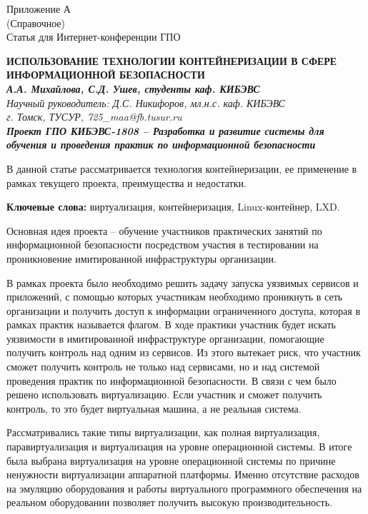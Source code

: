 
\begin{center}
Приложение А\\
(Справочное)\\
Статья для Интернет-конференции ГПО
\end{center}
\vspace{\baselineskip}

\begin{center}
\textbf{ИСПОЛЬЗОВАНИЕ ТЕХНОЛОГИИ КОНТЕЙНЕРИЗАЦИИ В СФЕРЕ ИНФОРМАЦИОННОЙ БЕЗОПАСНОСТИ}\\
\textbf{\textit{А.А. Михайлова, С.Д. Ушев, студенты каф. КИБЭВС}}\\
\textit{Научный руководитель: Д.С. Никифоров, мл.н.с. каф. КИБЭВС}\\
\textit{г. Томск, ТУСУР, 725\_maa@fb.tusur.ru}\\
\textbf{\textit{Проект ГПО КИБЭВС-1808 – Разработка и развитие системы для обучения и проведения практик по информационной безопасности}}
\end{center}
В данной статье рассматривается технология контейнеризации, ее применение в рамках текущего проекта, преимущества и недостатки.\par
\textbf{Ключевые слова: }виртуализация, контейнеризация, Linux-контейнер, LXD.\par
Основная идея проекта -- обучение участников практических занятий по информационной безопасности посредством участия в тестировании на проникновение имитированной инфраструктуры организации.\par
В рамках проекта было необходимо решить задачу запуска уязвимых сервисов и приложений,  с помощью которых участникам необходимо проникнуть в сеть организации и получить доступ к информации ограниченного доступа, которая в рамках практик называется флагом. В ходе практики участник будет искать уязвимости в имитированной инфраструктуре организации, помогающие получить контроль над одним из сервисов. Из этого вытекает риск, что участник сможет получить контроль не только над сервисами, но и над системой проведения практик по информационной безопасности. В связи с чем было решено использовать виртуализацию. Если участник и сможет получить контроль, то это будет виртуальная машина, а не реальная система.\par
Рассматривались такие типы виртуализации, как полная виртуализация, паравиртуализация и виртуализация на уровне операционной системы. В итоге была выбрана виртуализация на уровне операционной системы по причине ненужности виртуализации аппаратной платформы. Именно отсутствие расходов на эмуляцию оборудования и работы виртуального программного обеспечения на реальном оборудовании позволяет получить высокую производительность.\par
